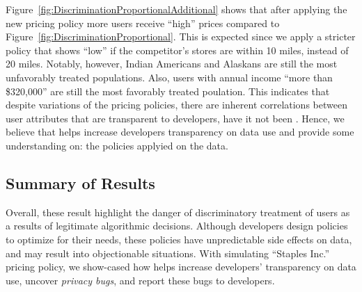 Figure~\ref{fig:DiscriminationProportionalAdditional} shows that after
applying the new  pricing policy more users receive ``high'' prices
compared to Figure~\ref{fig:DiscriminationProportional}. This is expected
since we apply a stricter policy that shows ``low'' if the competitor's
stores are within 10 miles,  instead of 20 miles. Notably, however, Indian Americans
and Alaskans are still the most unfavorably treated populations. Also, users
with annual income ``more than \$320,000'' are still the most favorably treated
poulation. This indicates that despite variations of the pricing policies,
there are inherent correlations between user attributes that are transparent
to developers, have it not been \sysname. Hence, we believe that \sysname
helps increase developers transparency on data use and provide some understanding
on: the policies applyied on the data.


\subsection{\normalsize Summary of Results}
Overall, these result highlight the danger of discriminatory treatment of
users as a results of legitimate algorithmic decisions. Although developers
design policies to optimize for their needs, these policies have unpredictable
side effects on data, and may result into objectionable situations. With simulating
``Staples Inc.'' pricing policy, we show-cased how \sysname helps increase
developers' transparency on data use, uncover {\em privacy bugs}, and report
these bugs to developers.

\begin{figure*}[t]
{
  \caption{\textbf{Prices shown to users and their dependency on income,
          race, and sex.} Shows the proportion of high versus low
          prices shown to users based on (a) income, (b) race, and (c) sex.
          In this case, the pricing policy is stricter and results to ``low''
          prices if user's distance from a competitor's store is less than 10
          miles. Figure (a) reveals that a users with annual income less than
          \$5,000 still receives proportionaly more high prices than a user with
          annual income more than \$320,000. Figure (b) indicates that an
          Indian American or an Alaskan users still receives notably more high
          prices than any other user. Figure (c) shows that male and female
          users receive approximately the same proportion of high versus
          low prices.
  }
  \label{fig:DiscriminationProportionalAdditional}
}
\end{figure*}
